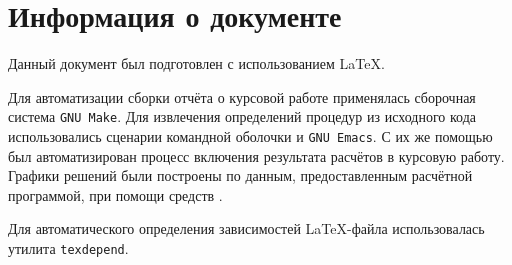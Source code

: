 \documentclass{article}
\numberwithin{equation}{section}
\begin{document}
\clearpage
\part{Информация о документе}

Данный документ был подготовлен с использованием \LaTeX{}.

Для автоматизации сборки отчёта о курсовой работе применялась
сборочная система \texttt{GNU Make}. Для извлечения определений
процедур из исходного кода использовались сценарии командной оболочки
и \texttt{GNU Emacs}. С их же помощью был автоматизирован процесс
включения результата расчётов в курсовую работу. Графики решений были
построены по данным, предоставленным расчётной программой, при помощи
средств \MP.

Для автоматического определения зависимостей
\LaTeX{}-файла использовалась утилита \texttt{texdepend}.
\end{document}
